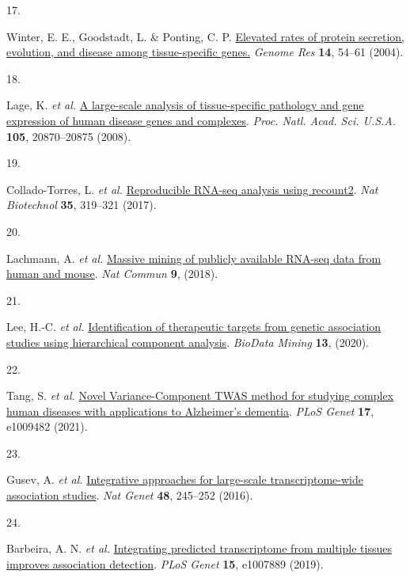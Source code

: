 \documentclass[
  a4paper,
]{article}
\newlength{\cslhangindent}
\newlength{\csllabelwidth}
\newlength{\cslentryspacingunit} %
\newenvironment{CSLReferences}[2] %
 {%
  \setlength{\parindent}{0pt}
  \ifodd #1
  \let\oldpar\par
  \def\par{\hangindent=\cslhangindent\oldpar}
  \fi
  \setlength{\parskip}{#2\cslentryspacingunit}
 }%
 {}
\newcommand{\CSLLeftMargin}[1]{\parbox[t]{\csllabelwidth}{#1}}
\newcommand{\CSLRightInline}[1]{\parbox[t]{\linewidth - \csllabelwidth}{#1}\break}
\begin{document}
\begin{CSLReferences}{0}{0}
\leavevmode{}%
\CSLLeftMargin{17. }%
\CSLRightInline{Winter, E. E., Goodstadt, L. \& Ponting, C. P. \href{https://doi.org/10.1101/gr.1924004}{Elevated rates of protein secretion, evolution, and disease among tissue-specific genes.} \emph{Genome Res} \textbf{14}, 54--61 (2004).}

\leavevmode{}%
\CSLLeftMargin{18. }%
\CSLRightInline{Lage, K. \emph{et al.} \href{https://doi.org/10.1073/pnas.0810772105}{A large-scale analysis of tissue-specific pathology and gene expression of human disease genes and complexes}. \emph{Proc. Natl. Acad. Sci. U.S.A.} \textbf{105}, 20870--20875 (2008).}

\leavevmode{}%
\CSLLeftMargin{19. }%
\CSLRightInline{Collado-Torres, L. \emph{et al.} \href{https://doi.org/10.1038/nbt.3838}{Reproducible RNA-seq analysis using recount2}. \emph{Nat Biotechnol} \textbf{35}, 319--321 (2017).}

\leavevmode{}%
\CSLLeftMargin{20. }%
\CSLRightInline{Lachmann, A. \emph{et al.} \href{https://doi.org/10.1038/s41467-018-03751-6}{Massive mining of publicly available RNA-seq data from human and mouse}. \emph{Nat Commun} \textbf{9}, (2018).}

\leavevmode{}%
\CSLLeftMargin{21. }%
\CSLRightInline{Lee, H.-C. \emph{et al.} \href{https://doi.org/10.1186/s13040-020-00216-9}{Identification of therapeutic targets from genetic association studies using hierarchical component analysis}. \emph{BioData Mining} \textbf{13}, (2020).}

\leavevmode{}%
\CSLLeftMargin{22. }%
\CSLRightInline{Tang, S. \emph{et al.} \href{https://doi.org/10.1371/journal.pgen.1009482}{Novel Variance-Component TWAS method for studying complex human diseases with applications to Alzheimer's dementia}. \emph{PLoS Genet} \textbf{17}, e1009482 (2021).}

\leavevmode{}%
\CSLLeftMargin{23. }%
\CSLRightInline{Gusev, A. \emph{et al.} \href{https://doi.org/10.1038/ng.3506}{Integrative approaches for large-scale transcriptome-wide association studies}. \emph{Nat Genet} \textbf{48}, 245--252 (2016).}

\leavevmode{}%
\CSLLeftMargin{24. }%
\CSLRightInline{Barbeira, A. N. \emph{et al.} \href{https://doi.org/10.1371/journal.pgen.1007889}{Integrating predicted transcriptome from multiple tissues improves association detection}. \emph{PLoS Genet} \textbf{15}, e1007889 (2019).}


\end{CSLReferences}
\end{document}
